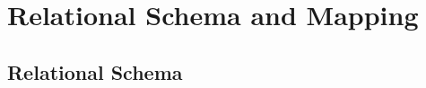 \section{Relational Schema and Mapping}
\label{sec:schema}

\subsection{Relational Schema}
\label{sec:schema-diagram}



\label{sec:relations}



